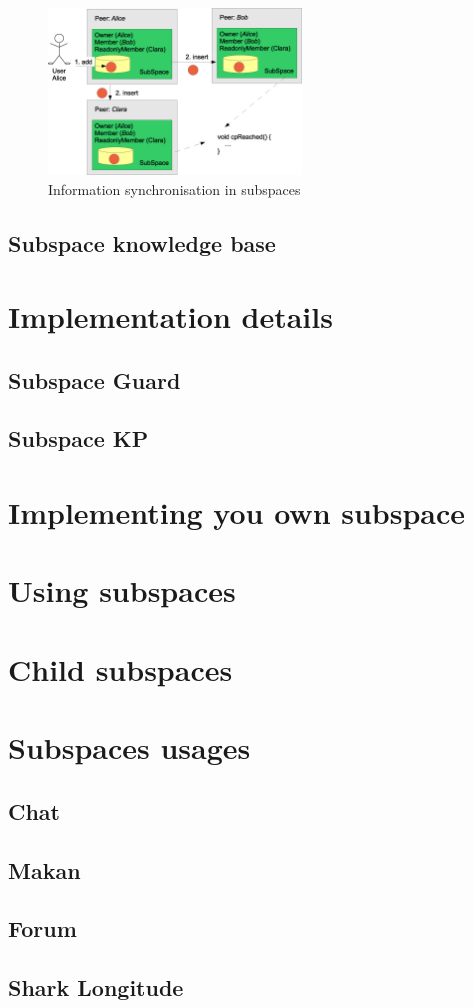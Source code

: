 \begin{figure}[t]
\centering
\includegraphics[width=0.60\textwidth]{subspaceAddingCP.eps}
\caption{Information synchronisation in subspaces}
\label{fig:subspaceAddingCP}
\end{figure}

\subsection{Subspace knowledge base}

\section{Implementation details}
\subsection{Subspace Guard}
\subsection{Subspace KP}
\section{Implementing you own subspace}
\section{Using subspaces}

\section{Child subspaces}

\section{Subspaces usages}
\subsection{Chat}
\subsection{Makan}
\subsection{Forum}
\subsection{Shark Longitude}
